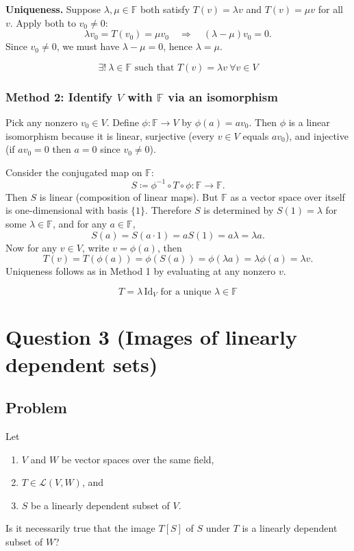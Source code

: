 \documentclass[12pt]{article}
\newcommand{\F}{\mathbb{F}}
\newcommand{\cL}{\mathcal{L}}
\begin{document}
\medskip
\noindent\textbf{Uniqueness.}
Suppose $\lambda,\mu\in\F$ both satisfy $T(v)=\lambda v$ and $T(v)=\mu v$ for all $v$.
Apply both to $v_0\neq 0$:
\[
\lambda v_0 = T(v_0) = \mu v_0 \quad\Rightarrow\quad (\lambda-\mu)v_0=0.
\]
Since $v_0\neq 0$, we must have $\lambda-\mu=0$, hence $\lambda=\mu$.

\[
\boxed{\,\exists!\ \lambda\in\F\text{ such that }T(v)=\lambda v\ \forall v\in V\,}
\]

\subsubsection{Method 2: Identify $V$ with $\F$ via an isomorphism}
Pick any nonzero $v_0\in V$. Define $\phi:\F\to V$ by $\phi(a)=av_0$.
Then $\phi$ is a linear isomorphism because it is linear, surjective (every $v\in V$ equals $av_0$),
and injective (if $av_0=0$ then $a=0$ since $v_0\neq 0$).

Consider the conjugated map on $\F$:
\[
S \coloneqq \phi^{-1}\circ T \circ \phi : \F \to \F.
\]
Then $S$ is linear (composition of linear maps). But $\F$ as a vector space over itself is one-dimensional
with basis $\{1\}$. Therefore $S$ is determined by $S(1)=\lambda$ for some $\lambda\in\F$, and for any $a\in\F$,
\[
S(a)=S(a\cdot 1)=a S(1)=a\lambda=\lambda a.
\]
Now for any $v\in V$, write $v=\phi(a)$, then
\[
T(v)=T(\phi(a))=\phi(S(a))=\phi(\lambda a)=\lambda \phi(a)=\lambda v.
\]
Uniqueness follows as in Method 1 by evaluating at any nonzero $v$.

\[
\boxed{\,T=\lambda\,\mathrm{Id}_V\text{ for a unique }\lambda\in\F\,}
\]

\newpage
\section{Question 3 (Images of linearly dependent sets)}
\subsection{Problem}
Let
\begin{enumerate}[label=(\roman*)]
\item $V$ and $W$ be vector spaces over the same field,
\item $T\in \cL(V,W)$, and
\item $S$ be a linearly dependent subset of $V$.
\end{enumerate}
Is it necessarily true that the image $T[S]$ of $S$ under $T$ is a linearly dependent subset of $W$?
\end{document}
